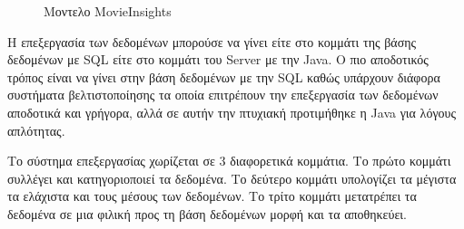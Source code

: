 \begin{figure}[p]
    \vspace*{-1cm}
    \hspace*{-1cm}
   \caption{Μοντελο MovieInsights}
   \label{model:movieinsights}
\end{figure}

Η επεξεργασία των δεδομένων μπορούσε να γίνει είτε στο κομμάτι της βάσης δεδομένων με SQL είτε στο κομμάτι του Server με την Java. Ο πιο αποδοτικός τρόπος είναι να γίνει στην βάση δεδομένων με την SQL καθώς υπάρχουν διάφορα συστήματα βελτιστοποίησης τα οποία επιτρέπουν την επεξεργασία των δεδομένων αποδοτικά και γρήγορα, αλλά σε αυτήν την πτυχιακή προτιμήθηκε η Java για λόγους απλότητας.

Το σύστημα επεξεργασίας χωρίζεται σε 3 διαφορετικά κομμάτια. Το πρώτο κομμάτι συλλέγει και κατηγοριοποιεί τα δεδομένα. Το δεύτερο κομμάτι υπολογίζει τα μέγιστα τα ελάχιστα και τους μέσους των δεδομένων. Το τρίτο
κομμάτι μετατρέπει τα δεδομένα σε μια φιλική προς τη βάση δεδομένων μορφή και τα αποθηκεύει.



